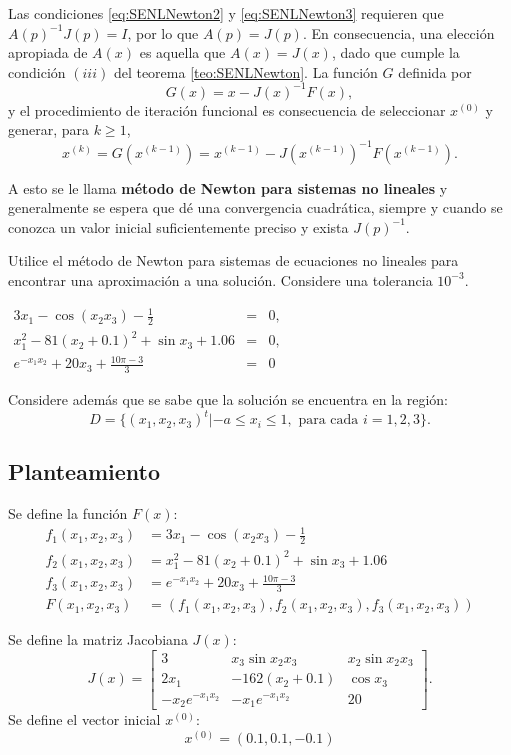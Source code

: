Las condiciones \ref{eq:SENLNewton2} y \ref{eq:SENLNewton3} requieren que $A(p)^{-1}J(p) = I$, por lo que $A(p)=J(p)$. En
consecuencia, una elección apropiada de $A(x)$ es aquella que $A(x)=J(x)$, dado que cumple la condición $(iii)$ del teorema 
\ref{teo:SENLNewton}. La función $G$ definida por
\[
	G(x) = x - J(x)^{-1}F(x),
\]
y el procedimiento de iteración funcional es consecuencia de seleccionar $x^{(0)}$ y generar, para $k\geq 1$,
\[ 
	x^{(k)} = G\left(x^{(k-1)} \right) = x^{(k-1)} - J\left(x^{(k-1)}\right)^{-1}F\left(x^{(k-1)} \right).
\]

A esto se le llama \textbf{método de Newton para sistemas no lineales} y generalmente se espera que dé una convergencia 
cuadrática, siempre y cuando se conozca un valor inicial suficientemente preciso y exista $J(p)^{-1}$.

\begin{exerciseT}
Utilice el método de Newton para sistemas de ecuaciones no lineales para encontrar una aproximación a una solución. 
Considere una tolerancia $10^{-3}$.
\begin{center}
  $\begin{array}{rcl}
    3x_1 - \cos (x_2x_3) - \frac{1}{2} & = & 0,\\
    x_1^2 - 81(x_2 + 0.1)^2 + \sin x_3 + 1.06 & = & 0,\\
    e^{-x_1x_2} + 20x_3 + \frac{10\pi - 3}{3} & = & 0
  \end{array}$
\end{center}
Considere además que se sabe que la solución se encuentra en la región:
\[
	D=\{(x_1,x_2,x_3)^t | -a\leq x_i\leq 1, \mbox{ para cada } i=1,2,3\}.
\]

\subsection*{Planteamiento}
Se define la función $F(x)$:
\begin{align*}
	f_1(x_1,x_2,x_3) &= 3x_1 - \cos (x_2x_3) - \frac{1}{2} \\
	f_2(x_1,x_2,x_3) &= x_1^2 - 81(x_2 + 0.1)^2 + \sin x_3 + 1.06 \\
	f_3(x_1,x_2,x_3) &= e^{-x_1x_2} + 20x_3 + \frac{10\pi - 3}{3} \\
	F(x_1,x_2,x_3) &= \left(f_1(x_1,x_2,x_3), f_2(x_1,x_2,x_3), f_3(x_1,x_2,x_3) \right) 
\end{align*}

Se define la matriz Jacobiana $J(x)$:
\[
	J(x) = 
	\left[
	\begin{matrix}
		3 & x_3\sin x_2x_3 & x_2\sin x_2x_3 \\
		2x_1 & -162(x_2+0.1) & \cos x_3\\
		-x_2e^{-x_1x_2} & -x_1e^{-x_1x_2} & 20
	\end{matrix}
	\right].
\]
Se define el vector inicial $x^{(0)}$:
\[
	x^{(0)} = (0.1, 0.1, -0.1)
\]


\end{exerciseT}
